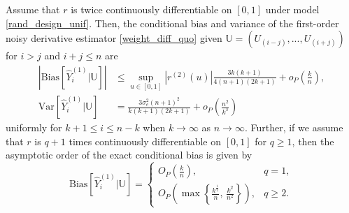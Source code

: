 \documentclass{uwstat572}
\theoremstyle{definition}
\renewcommand{\hat}{\widehat}
\theoremstyle{theorem}
\newenvironment{customthm}[1]
{\renewcommand\theinnercustomthm{#1}\innercustomthm}
{\endinnercustomthm}
\begin{document}
\begin{customthm}{1}[Theorem 1 in \citealt{liu2020smoothed}]
Assume that $r$ is twice continuously differentiable on $[0,1]$ under model \eqref{rand_design_unif}. Then, the conditional bias and variance of the first-order noisy derivative estimator \eqref{weight_diff_quo} given $\mathbb{U} = \left(U_{(i-j)},...,U_{(i+j)}\right)$ for $i>j$ and $i+j\leq n$ are 
\begin{align*}
	\left|\mathrm{Bias}\left[\hat{Y}_i^{(1)} \big| \mathbb{U}\right] \right| &\leq \sup_{u\in [0,1]} \left|r^{(2)}(u)\right| \frac{3k(k+1)}{4(n+1)(2k+1)} + o_P\left(\frac{k}{n}\right),\\
	\mathrm{Var}\left[\hat{Y}_i^{(1)} \big| \mathbb{U}\right] &= \frac{3\sigma_e^2 (n+1)^2}{k(k+1)(2k+1)} + o_P\left(\frac{n^2}{k^3}\right)
\end{align*}
uniformly for $k+1\leq i\leq n-k$ when $k\to \infty$ as $n\to \infty$. Further, if we assume that $r$ is $q+1$ times continuously differentiable on $[0,1]$ for $q\geq 1$, then the asymptotic order of the exact conditional bias is given by
\[
\mathrm{Bias}\left[\hat{Y}_i^{(1)} \big| \mathbb{U}\right]=
\begin{cases}
	O_P\left(\frac{k}{n}\right), & q=1,\\
	O_P\left(\max\left\{\frac{k^{\frac{1}{2}}}{n},\, \frac{k^2}{n^2}\right\}\right), & q\geq 2.
\end{cases}
\]
\end{customthm}
\end{document}
